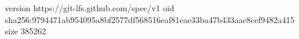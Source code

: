 version https://git-lfs.github.com/spec/v1
oid sha256:9794471ab954095a8bf2577df568516eaf81eae33ba47b433aac8cef9482a415
size 385262
